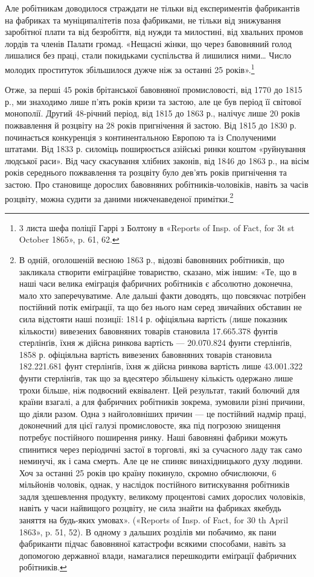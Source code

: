 \parcont{}  %
Але робітникам доводилося страждати не тільки від експериментів
фабрикантів на фабриках та муніципалітетів поза фабриками,
не тільки від знижування заробітної плати та від безробіття, від
нужди та милостині, від хвальних промов лордів та членів Палати
громад. «Нещасні жінки, що через бавовняний голод лишалися
без праці, стали покидьками суспільства й лишилися ними\dots{}
Число молодих проституток збільшилося дужче ніж за останні
25 років».\footnote{
3 листа шефа поліції Гаррі з Болтону в «Reports of Insp. of Fact,
for 3t st October 1865», p. 61, 62.
}

Отже, за перші 45 років брітанської бавовняної промисловості,
від 1770 до 1815 р., ми знаходимо лише п’ять років кризи та застою,
але це був період її світової монополії. Другий 48-річний період,
від 1815 до 1863 р., налічує лише 20 років пожвавлення
й розцвіту на 28 років пригнічення й застою. Від 1815 до 1830 р.
починається конкуренція з континентальною Европою та із
Сполученими штатами. Від 1833 р. силоміць поширюється азійські
ринки коштом «руйнування людської раси». Від часу скасування
хлібних законів, від 1846 до 1863 р., на вісім років середнього
пожвавлення та розцвіту було дев’ять років пригнічення
та застою. Про становище дорослих бавовняних робітників-чоловіків,
навіть за часів розцвіту, можна судити за даними нижченаведеної
примітки.\footnote{
В одній, оголошеній весною 1863 р., відозві бавовняних робітників,
що закликала створити еміграційне товариство, сказано, між іншим:
«Те, що в наші часи велика еміграція фабричних робітників є абсолютно
доконечна, мало хто заперечуватиме. Але дальші факти доводять, що
повсякчас потрібен постійний потік еміґрації, та що без нього нам серед
звичайних обставин не сила відстояти наші позиції: 1814 р. офіціяльна
вартість (лише показник кількости) вивезених бавовняних товарів становила
17.665.378 фунтів стерлінґів, їхня ж дійсна ринкова вартість —
20.070.824 фунти стерлінґів, 1858 р. офіціяльна вартість вивезених бавовняних
товарів становила 182.221.681 фунт стерлінґів, їхня ж дійсна
ринкова вартість лише 43.001.322 фунти стерлінґів, так що за вдесятеро
збільшену кількість одержано лише трохи більше, ніж подвоєний еквівалент.
Цей результат, такий болючий для країни взагалі, а для фабричних
робітників зокрема, зумовили різні причини, що діяли разом. Одна
з найголовніших причин — це постійний надмір праці, доконечний для
цієї галузі промисловосте, яка під погрозою знищення потребує постійного
поширення ринку. Наші бавовняні фабрики можуть спинитися через
періодичні застої в торговлі, які за сучасного ладу так само неминучі,
як і сама смерть. Але це не спиняє винахідницького духу людини. Хоч
за останні 25 років цю країну покинуло, скромно обчислюючи, 6 мільйонів
чоловік, однак, у наслідок постійного витискування робітників задля
здешевлення продукту, великому процентові самих дорослих чоловіків,
навіть у часи найвищого розцвіту, не сила знайти на фабриках якебудь
заняття на будь-яких умовах». («Reports of Insp. of Fact, for 30 th April
1863», p. 51, 52). В одному з дальших розділів ми побачимо, як пани
фабриканти підчас бавовняної катастрофи всякими способами, навіть за
допомогою державної влади, намагалися перешкодити еміґрації фабричних
робітників.
}
\parbreak{}  %
